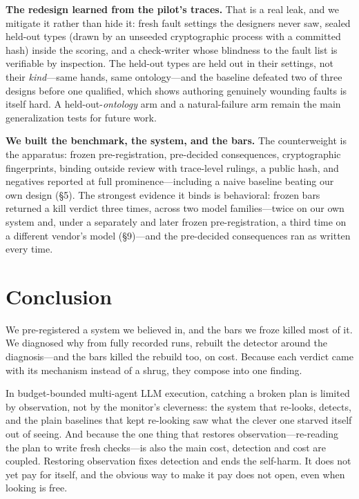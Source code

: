 \documentclass[acmsmall,screen]{acmart}
\begin{document}
\textbf{The redesign learned from the pilot's traces.} That is a real leak, and
we mitigate it rather than hide it: fresh fault settings the designers never
saw, sealed held-out types (drawn by an unseeded cryptographic process with a
committed hash) inside the scoring, and a check-writer whose blindness to the
fault list is verifiable by inspection. The held-out types are held out in their
settings, not their \emph{kind}---same hands, same ontology---and the baseline
defeated two of three designs before one qualified, which shows authoring
genuinely wounding faults is itself hard. A held-out-\emph{ontology} arm and a
natural-failure arm remain the main generalization tests for future work.

\textbf{We built the benchmark, the system, and the bars.} The counterweight is
the apparatus: frozen pre-registration, pre-decided consequences, cryptographic
fingerprints, binding outside review with trace-level rulings, a public hash,
and negatives reported at full prominence---including a naive baseline beating
our own design (\S5). The strongest evidence it binds is behavioral: frozen bars
returned a kill verdict three times, across two model families---twice on our own
system and, under a separately and later frozen pre-registration, a third time on
a different vendor's model (\S9)---and the pre-decided consequences ran as written
every time.

\section{Conclusion}
We pre-registered a system we believed in, and the bars we froze killed most of
it. We diagnosed why from fully recorded runs, rebuilt the detector around the
diagnosis---and the bars killed the rebuild too, on cost. Because each verdict
came with its mechanism instead of a shrug, they compose into one finding.

In budget-bounded multi-agent LLM execution, catching a broken plan is limited
by observation, not by the monitor's cleverness: the system that re-looks,
detects, and the plain baselines that kept re-looking saw what the clever one
starved itself out of seeing. And because the one thing that restores
observation---re-reading the plan to write fresh checks---is also the main cost,
detection and cost are coupled. Restoring observation fixes detection and ends
the self-harm. It does not yet pay for itself, and the obvious way to make it
pay does not open, even when looking is free.
\end{document}
